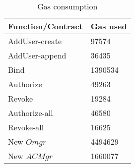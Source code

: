 \begin{table}[h]
    \centering
    \caption[Gas consumption]{Gas consumption}
    \label{table:gasUsed}
    \begin{tabular}{p{45mm}p{30mm}}
    \toprule[1.1pt]
    Function/Contract   & Gas used\\
    \midrule[1.1pt]
    \multirow{1}{*}{AddUser-create} & 97574\\
    \midrule
    \multirow{1}{*}{AddUser-append} & 36435\\
    \midrule
    \multirow{1}{*}{Bind} & 1390534\\
    \midrule
    \multirow{1}{*}{Authorize} & 49263\\
    \midrule
    \multirow{1}{*}{Revoke} & 19284\\
    \midrule
    \multirow{1}{*}{Authorize-all} & 46580\\    
    \midrule
    \multirow{1}{*}{Revoke-all} & 16625\\
    \midrule
    \multirow{1}{*}{New $Omgr$} & 4494629\\
    \midrule
    \multirow{1}{*}{New $ACMgr$} & 1660077\\    
    \bottomrule[1.1pt]
    \end{tabular}
    \end{table}